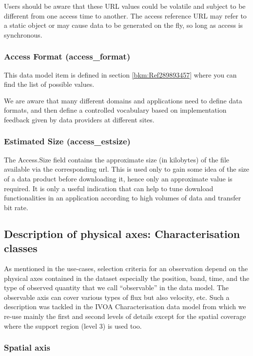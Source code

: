 \documentclass[11pt,a4paper]{ivoa}
\begin{document}
Users should be aware that these URL values could be volatile and subject to be different from one access time to
another.  The access reference URL may refer to a static object or may cause data to be generated on the fly, so long
as access is synchronous.

\subsubsection{Access Format (access\_format)}
\label{bkm:Ref297463580}This data model item is defined in section \ref{bkm:Ref289893457} where you can find the list of
possible values.

We are aware that many different domains and applications need to define data formats, and then define a controlled
vocabulary based on implementation feedback given by data providers at different sites.

\subsubsection{Estimated Size (access\_estsize)}
The Access.Size field contains the approximate size (in kilobytes) of the file available via the corresponding url. 
This is used only to gain some idea of the size of a data product before downloading it, hence only an approximate
value is required. It is only a useful indication that can help to tune download functionalities in an application
according to high volumes of data and transfer bit rate. 

\subsection{Description of physical axes: Characterisation classes}
As mentioned in the use-cases, selection criteria for an observation depend on the physical axes contained in the
dataset especially the position, band, time, and the type of observed quantity that we call ``observable'' in the data
model. The observable axis can cover various types of flux but also velocity, etc.  Such a description was tackled in
the IVOA Characterisation data model \citep{2008ivoa.spec.0325L} from which we re-use mainly the first and second levels
of details except for the spatial coverage where the support region (level 3) is used too.  

\subsubsection{Spatial axis}
\end{document}
